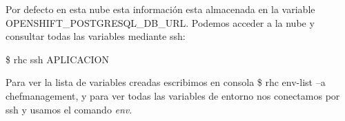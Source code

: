 Por defecto en esta nube esta información esta almacenada en la variable OPENSHIFT\_POSTGRESQL\_DB\_URL. Podemos acceder a la nube y consultar todas las variables mediante ssh:
\begin{center}
\$ rhc ssh APLICACION
\end{center}

Para ver la lista de variables creadas escribimos en consola \$ rhc env-list --a chefmanagement, y para ver todas las variables de entorno nos conectamos por ssh y usamos el comando \emph{env}.

